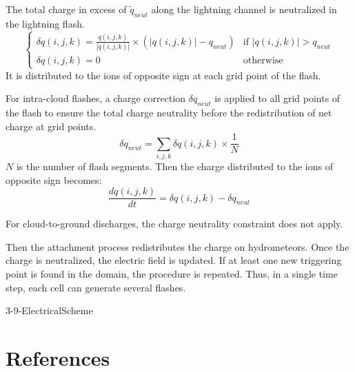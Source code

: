 The total charge in excess of $\tilde q_{neut}$ along the lightning channel is neutralized in the lightning flash.
\begin{equation}
  \left\{
  \begin{array}{ll}
    \delta q(i,j,k) = \frac{q(i,j,k)} {|q(i,j,k)|} \times \left( |q(i,j,k)| - q_{neut} \right) & \mbox{if } |q(i,j,k)| > q_{neut} \\
    \delta q(i,j,k) = 0 & \mbox{otherwise}
  \end{array}
  \right.
\end{equation}
It is distributed to the ions of opposite sign at each grid point of the flash. 

For intra-cloud flashes, a charge correction $\delta q_{neut}$ is applied to all grid points of the flash to ensure the total charge neutrality \citep{MacGorman-2001} before the redistribution of net charge at grid points. 
\begin{equation}
  \delta q_{neut} = \sum_{i,j,k} \delta q(i,j,k) \times \frac{1}{N}
\end{equation}
$N$ is the number of flash segments.
Then the charge distributed to the ions of opposite sign becomes:
\begin{equation}
  \frac{dq(i,j,k)}{dt} = \delta q(i,j,k) - \delta q_{neut}
\end{equation}

For cloud-to-ground discharges, the charge neutrality constraint does not apply.

Then the attachment process redistributes the charge on hydrometeors.
Once the charge is neutralized, the electric field is updated.
If at least one new triggering point is found in the domain, the procedure is repeated.
Thus, in a single time step, each cell can generate several flashes.


\begin{btSect}{3-9-ElectricalScheme}
\section{References}
\btPrintCited
\end{btSect}
